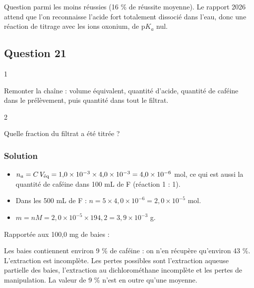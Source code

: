 \documentclass[11pt,a4paper]{article}
\providecommand{\tightlist}{\setlength{\itemsep}{0pt}\setlength{\parskip}{0pt}}
\newcommand{\equationajustee}[1]{%
  \sbox{\boiteequation}{$\displaystyle #1$}%
  \ifdim\wd\boiteequation>\linewidth
    \[\resizebox{\linewidth}{!}{\usebox{\boiteequation}}\]%
  \else
    \[#1\]%
  \fi}
\begin{document}
\begin{jury}

Question parmi les moins réussies (16 \% de réussite moyenne). Le rapport 2026 attend que l'on reconnaisse l'acide fort totalement dissocié dans l'eau, donc une réaction de titrage avec les ions oxonium, de p\(K_a\) nul.

\end{jury}

\hypertarget{question-21}{%
\subsection{Question 21}\label{question-21}}

\begin{indication}{1}

Remonter la chaîne : volume équivalent, quantité d'acide, quantité de caféine dans le prélèvement, puis quantité dans tout le filtrat.

\end{indication}

\begin{indication}{2}

Quelle fraction du filtrat a été titrée ?

\end{indication}

\hypertarget{solution-20}{%
\subsubsection{Solution}\label{solution-20}}

\begin{itemize}
\tightlist
\item
  \(n_a = C\,V_{\rm \text{éq}} = 1{,}0\times10^{-3}\times4{,}0\times10^{-3} = 4{,}0\times10^{-6}\) mol, ce qui est aussi la quantité de caféine dans 100 mL de F (réaction 1 : 1).
\item
  Dans les 500 mL de F : \(n = 5\times4{,}0\times10^{-6} = 2{,}0\times10^{-5}\) mol.
\item
  \(m = nM = 2{,}0\times10^{-5}\times194{,}2 = 3{,}9\times10^{-3}\) g.
\end{itemize}

\equationajustee{\boxed{m = 3{,}9\ \mathrm{mg}}}

Rapportée aux 100,0 mg de baies :

\equationajustee{\boxed{w = 3{,}9\ \%\ \text{en masse}}}

Les baies contiennent environ 9 \% de caféine : on n'en récupère qu'environ 43 \%. L'extraction est incomplète. Les pertes possibles sont l'extraction aqueuse partielle des baies, l'extraction au dichlorométhane incomplète et les pertes de manipulation. La valeur de 9 \% n'est en outre qu'une moyenne.
\end{document}
